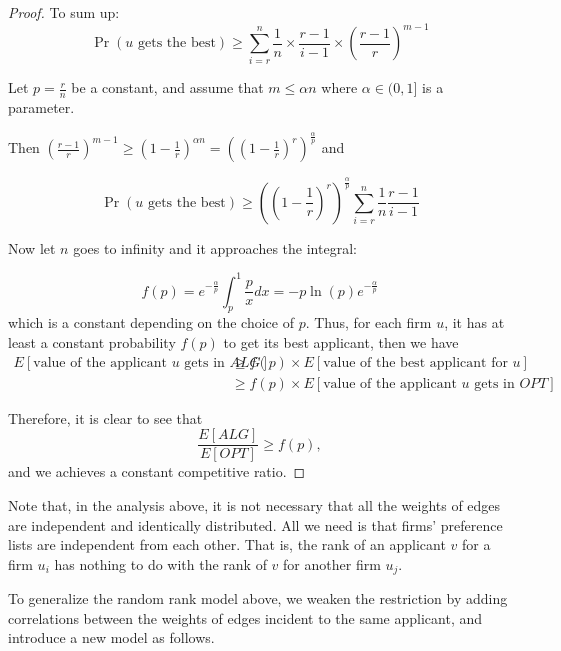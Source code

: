 \begin{proof}
    To sum up:
    $$\Pr(u\text{ gets the best}) \ge \sum_{i=r}^{n} \frac{1}{n} \times \frac{r-1}{i-1} \times (\frac{r-1}{r})^{m-1}$$

    Let $p = \frac{r}{n}$ be a constant, and assume that $m \le \alpha n$ where $\alpha \in (0,1]$ is a parameter.

    Then $(\frac{r-1}{r})^{m-1} \ge (1-\frac{1}{r})^{\alpha n} = ((1-\frac{1}{r})^{r})^{\frac{\alpha}{p}}$ and

    $$\Pr(u \text{ gets the best}) \ge ((1 - \frac{1}{r})^r)^{\frac{\alpha}{p}} \sum_{i=r}^{n} \frac{1}{n}\frac{r-1}{i-1}$$

    Now let $n$ goes to infinity and it approaches the integral:

    $$f(p) = e^{-\frac{\alpha}{p}} \int_{p}^{1} \frac{p}{x} dx = -p \ln(p) e^{-\frac{\alpha}{p}}$$
    which is a constant depending on the choice of $p$.
    Thus, for each firm $u$, it
    has at least a constant probability $f(p)$ to get its best applicant, then we have
    \begin{align*}
        E[\text{value of the applicant }u\text{ gets in }ALG]
        & \ge f(p) \times E[\text{value of the best applicant for }u] \\
        & \ge f(p) \times E[\text{value of the applicant }u\text{ gets in }OPT]
    \end{align*}
    
    Therefore, it is clear to see that
    \[ \frac{E[ALG]}{E[OPT]} \ge f(p), \]
    and we achieves a constant competitive ratio.
\end{proof}

Note that, in the analysis above, it is not necessary that all the weights of edges are independent and identically distributed.
All we need is that firms' preference lists are independent from each other. 
That is, the rank of an applicant $v$ for a firm $u_i$ has nothing to do with the rank of $v$ for another firm $u_j$.

To generalize the random rank model above, we weaken the restriction by
adding correlations between the weights of edges incident to the same applicant,
and introduce a new model as follows.

